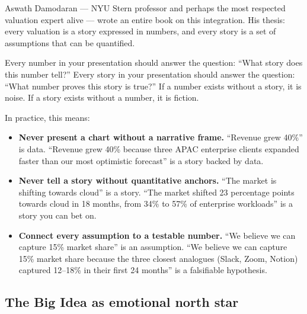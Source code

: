 Aswath Damodaran --- NYU Stern professor and perhaps the most respected valuation expert alive --- wrote an entire book on this integration. His thesis: every valuation is a story expressed in numbers, and every story is a set of assumptions that can be quantified.

\begin{keybox}
Every number in your presentation should answer the question: ``What story does this number tell?'' Every story in your presentation should answer the question: ``What number proves this story is true?'' If a number exists without a story, it is noise. If a story exists without a number, it is fiction.
\end{keybox}

In practice, this means:

\begin{itemize}
  \item \textbf{Never present a chart without a narrative frame.} ``Revenue grew 40\%'' is data. ``Revenue grew 40\% because three APAC enterprise clients expanded faster than our most optimistic forecast'' is a story backed by data.
  \item \textbf{Never tell a story without quantitative anchors.} ``The market is shifting towards cloud'' is a story. ``The market shifted 23 percentage points towards cloud in 18 months, from 34\% to 57\% of enterprise workloads'' is a story you can bet on.
  \item \textbf{Connect every assumption to a testable number.} ``We believe we can capture 15\% market share'' is an assumption. ``We believe we can capture 15\% market share because the three closest analogues (Slack, Zoom, Notion) captured 12--18\% in their first 24 months'' is a falsifiable hypothesis.
\end{itemize}


\subsection{The Big Idea as emotional north star}

